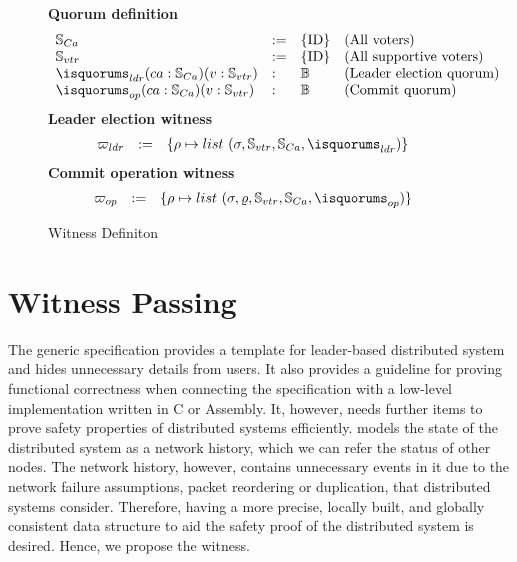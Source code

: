 \begin{figure}
\raggedright
\textbf{Quorum definition}  \\
$$
\begin{array}{llll}
\accsset & := & \set{\nodeid} & \mbox{(All voters)}\\
\voters & := & \set{\nodeid} & \mbox{(All supportive voters)}\\
\isquorums_{ldr} (ca: \accsset) (v: \voters) &:& \mathbb{B} & \mbox{(Leader election quorum)} \\
\isquorums_{op} (ca: \accsset) (v: \voters)  &:&  \mathbb{B} &  \mbox{(Commit quorum)}\\
\end{array}
$$
\textbf{Leader election witness}  \\
$$
\begin{array}{llll}
\ldrwitness &:=&  \set{\termnum \mapsto list\ (\dstate, \voters, \accsset, \isquorums_{ldr})} & \\
\end{array}
$$
\textbf{Commit operation witness}  \\
$$
\begin{array}{llll}
\opwitness &:=& \set{\termnum \mapsto list\ (\dstate, \updatefunc, \voters,
	\accsset, \isquorums_{op})}& 
\end{array}
$$
\caption{Witness Definiton}
\label{fig:chapter:witnesspassing:witness-definition}
\end{figure}

\section{Witness Passing}
\label{chapter:witnesspassing:sec:witness-passing}

The generic specification provides a template for leader-based distributed
system and hides unnecessary details from users. It also provides a guideline 
for proving functional correctness when connecting the specification with a 
low-level implementation written in C or Assembly.
It, however, needs further items to prove safety properties of distributed 
systems efficiently.  
\sysname{} models the state of the distributed system as a network history, 
which we can refer the status of other nodes.
The network history, however, contains unnecessary events in it due to
the network failure assumptions, packet reordering or duplication, that  
distributed systems consider. Therefore, having a more precise, 
locally built, and globally consistent data structure to aid the safety proof 
of the distributed system is desired. Hence, we propose the witness.   

